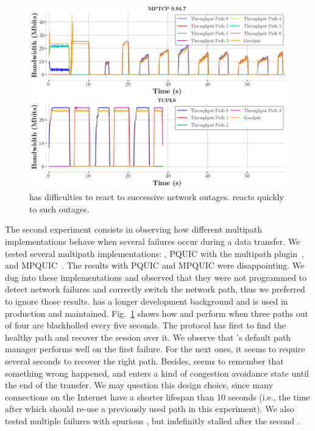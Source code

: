 \begin{figure}[!t]
  \begin{center}
    \includegraphics[width=\columnwidth]{figures/tcpls_mptcp.png}
  \end{center}
\vspace{-0.5cm}
  \caption{\mptcp has difficulties to react to successive network outages. \tcpls reacts quickly to such outages.}
  \label{fig:failover}
\end{figure}

The second experiment consists in observing how different multipath
implementations behave when several failures occur during a data transfer. We
tested several multipath implementations: \mptcp, PQUIC with the multipath
plugin~\cite{de2019pluginizing}, and MPQUIC~\cite{de2017multipath}.
The results with PQUIC and MPQUIC were disappointing. We dug into these implementations and observed that they were not programmed to detect network failures and correctly switch the network path, thus we preferred to ignore those results. \mptcp has a longer development background and is used in production and maintained. Fig.~\ref{fig:failover} shows how \mptcp and \tcpls perform when three paths out of four are blackholled every five seconds. The protocol has first to find the healthy path and recover the session over it. We observe that \mptcp's default path manager performs well on the first
failure. For the next ones, it seems to require several seconds to
recover the right path. Besides, \mptcp seems to remember that something wrong happened, and enters a kind of congestion avoidance state until the end of the transfer. We may question this design choice, since many \tcp connections on the Internet have a shorter lifespan than 10 seconds (i.e., the time after which \mptcp should re-use a previously used path in this experiment). We also tested multiple failures with spurious \rst, but \mptcp indefinitly stalled after the second \rst.

